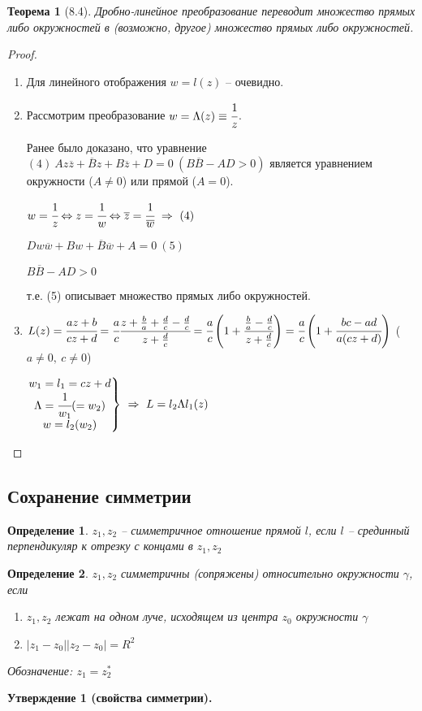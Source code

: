 \documentclass[final]{report}
\newcommand{\forcenewline}{$\phantom{\mbox{newline}}$\newline}
\newcommand{\then}{\ \Rightarrow\ }
\newcommand{\LRA}{\Leftrightarrow}
\renewcommand{\bar}{\overline}
\newcommand{\g}{\gamma}
\renewcommand{\L}{\Lambda}
\newcommand{\z}{\bar{z}}
\newcommand{\bsys}[1]{\left.\begin{matrix}#1\end{matrix}\right\}}
\newcommand{\opr}[1]{\begin{opred}#1\end{opred}}
\newtheorem*{theor}{Теорема}
\newtheorem*{opred}{Определение}
\theoremstyle{remark}
\begin{document}
\begin{theor}[8.4]
Дробно-линейное преобразование переводит множество прямых либо окружностей в (возможно, другое) множество прямых либо окружностей.
\end{theor}
\begin{proof}
\begin{enumerate}
\item Для линейного отображения $w=l(z)$ -- очевидно.
\item Рассмотрим преобразование $w=\Lambda(z)\equiv \cfrac 1z$.

Ранее было доказано, что уравнение $(4)\ Az\z+\bar{B}z+B\z+D=0\ (B\bar{B}-AD>0)$ является уравнением окружности ($A\neq0$) или прямой ($A=0$).

$w=\cfrac 1z \LRA z=\cfrac 1w \LRA \bar{z}=\cfrac {1}{\bar{w}} \then (4)$

$Dw\bar{w}+Bw+\bar{B}\bar{w}+A=0\ (5)$

$B\bar{B}-AD>0$

т.е. (5) описывает множество прямых либо окружностей.
\item $L(z)=\cfrac{az+b}{cz+d}=\cfrac ac \cfrac {z+\frac ba+\frac dc-\frac dc}{z+\frac dc}=\cfrac ac\left(1+\cfrac{\frac ba-\frac dc}{z+\frac dc}\right)=\cfrac ac\left(1+\cfrac{bc-ad}{a(cz+d)}\right)$ ($a\neq 0,\ c\neq 0$)

$\bsys{w_1=l_1=cz+d \\ \L=\cfrac {1}{w_1}(=w_2) \\ w=l_2(w_2)}\then L=l_2\L l_1(z)$
\end{enumerate}
\end{proof}

\subsection{Сохранение симметрии}

\opr{$z_1, z_2$ -- симметричное отношение прямой $l$, если $l$ -- срединный перпендикуляр к отрезку с концами в $z_1, z_2$}
\opr{$z_1, z_2$ симметричны (сопряжены) относительно окружности $\g$, если
\begin{enumerate}
\item $z_1, z_2$ лежат на одном луче, исходящем из центра $z_0$ окружности $\g$
\item $|z_1-z_0||z_2-z_0|=R^2$
\end{enumerate}
Обозначение: $z_1=z_2^*$}

{\bfseries Утверждение 1 (свойства симметрии).}
\end{document}
